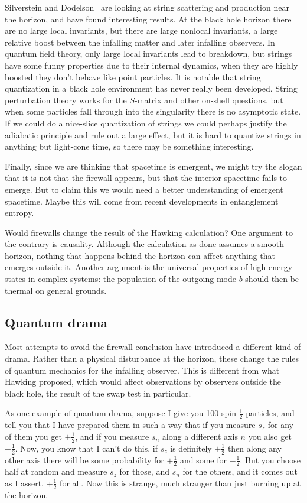 \documentclass[12pt]{article}
\begin{document}
Silverstein and Dodelson~\cite{Silverstein:2014yza}  are looking at string scattering and production near the horizon, and have found interesting results. At the black hole horizon there are no large local invariants, but there are large nonlocal invariants, a large relative boost between the infalling matter and later infalling observers.  In quantum field theory, only large local invariants lead to breakdown, but strings have some funny properties due to their internal dynamics, when they are highly boosted they don't behave like point particles.    It is notable that string quantization in a black hole environment has never really been developed.  String perturbation theory works for the $S$-matrix and other on-shell questions, but when some particles fall through into the singularity there is no asymptotic state.  If we could do a nice-slice quantization of strings we could perhaps justify the adiabatic principle and rule out a large effect, but it is hard to quantize strings in anything but light-cone time, so there may be something interesting.

Finally, since we are thinking that spacetime is emergent, we might try the slogan that it is not that the firewall appears, but that the interior spacetime fails to emerge.  But to claim this we would need a better understanding of emergent spacetime.  Maybe this will come from recent developments in entanglement entropy.

Would firewalls change the result of the Hawking calculation?  One argument to the contrary is causality. Although the calculation as done assumes a smooth horizon, nothing that happens behind the horizon can affect anything that emerges outside it.  Another argument is the universal properties of high energy states in complex systems: the population of the outgoing mode $b$ should then be thermal on general grounds.

\subsection{Quantum drama}

Most attempts to avoid the firewall conclusion have introduced a different kind of drama.  Rather than a physical disturbance at the horizon, these change the rules of quantum mechanics for the infalling observer.  This is different from what Hawking proposed, which would affect observations by observers outside the black hole, the result of the swap test in particular.

As one example of quantum drama, suppose I give you 100 spin-$\frac12$ particles, and tell you that I have prepared them in such a way that if you measure $s_z$ for any of them you get $+\frac12$, and if you measure $s_n$ along a different axis $n$ you also get $+\frac12$.  Now, you know that I can't do this, if $s_z$ is definitely $+\frac12$ then along any other axis there will be some probability for $+\frac12$ and some for $-\frac12$.  But you choose half at random and measure $s_z$ for those, and $s_n$ for the others, and it comes out as I assert, $+\frac 12$ for all.  Now this is strange, much stranger than just burning up at the horizon.
\end{document}
